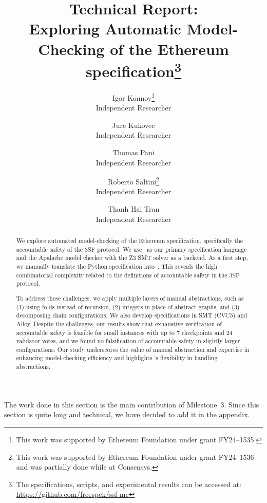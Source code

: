 \documentclass[12pt]{article}
\title{Technical Report:\\
    Exploring Automatic Model-Checking of the Ethereum specification\footnote{%
        The specifications, scripts, and experimental results can be accessed at:\\
        \url{https://github.com/freespek/ssf-mc}
    }}
\author{%
    Igor Konnov\thanks{This work was supported by Ethereum Foundation
    under grant FY24--1535.}\\ \small Independent Researcher \\
    \and
    Jure Kukovec\footnotemark[2] \\ \small Independent Researcher \\
    \and
    Thomas Pani\footnotemark[2] \\ \small Independent Researcher \\
    \and
    Roberto Saltini\thanks{This work was supported by Ethereum Foundation
    under grant FY24--1536 and was partially done while at Consensys.} \\ \small Independent Researcher \\
    \and
    Thanh Hai Tran\footnotemark[3] \\ \small Independent Researcher
}
\date{}
\begin{document}
\maketitle

\begin{abstract}

We explore automated model-checking of the Ethereum specification, specifically
the accountable safety of the 3SF protocol. We use~\tlap{} as our primary
specification language and the Apalache model checker with the Z3 SMT solver as
a backend. As a first step, we manually translate the Python specification
into~\tlap{}. This reveals the high combinatorial complexity related to the
definitions of accountable safety in the 3SF protocol.

To address these challenges, we apply multiple layers of manual abstractions,
such as (1) using folds instead of recursion, (2) integers in place of abstract
graphs, and (3) decomposing chain configurations. We also develop
specifications in SMT (CVC5) and Alloy. Despite the challenges, our results show that
exhaustive verification of accountable safety is feasible for small
instances with up to 7 checkpoints and 24 validator votes, and we found no
falsification of accountable safety in slightly larger configurations. Our
study underscores the value of manual abstraction and expertise in enhancing
model-checking efficiency and highlights \tlap{}'s flexibility in handling
abstractions.

\end{abstract}

\setcounter{tocdepth}{2}  %
\tableofcontents

















\pagebreak

\appendix

The work done in this section is the main contribution of Milestone~3. Since
this section is quite long and technical, we have decided to add it in the
appendix.




\end{document}
